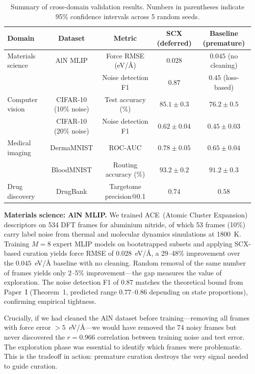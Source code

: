 \begin{table}
\centering
\caption{Summary of cross-domain validation results. Numbers in parentheses indicate 95\% confidence intervals across 5 random seeds.}
\label{tab:summary}
\begin{tabular}{lcccc}
\hline
Domain & Dataset & Metric & SCX (deferred) & Baseline (premature) \\
\hline
Materials science & AlN MLIP & Force RMSE (eV/{\AA}) & $0.028$ & $0.045$ (no cleaning) \\
 & & Noise detection F1 & $0.87$ & $0.45$ (loss-based) \\
Computer vision & CIFAR-10 (10\% noise) & Test accuracy (\%) & $85.1 \pm 0.3$ & $76.2 \pm 0.5$ \\
 & CIFAR-10 (20\% noise) & Noise detection F1 & $0.62 \pm 0.04$ & $0.45 \pm 0.03$ \\
Medical imaging & DermaMNIST & ROC-AUC & $0.78 \pm 0.05$ & $0.65 \pm 0.04$ \\
 & BloodMNIST & Routing accuracy (\%) & $93.2 \pm 0.2$ & $91.2 \pm 0.3$ \\
Drug discovery & DrugBank & Targetome precision@0.1 & $0.74$ & $0.58$ \\
\hline
\end{tabular}
\end{table}

\textbf{Materials science: AlN MLIP.} We trained ACE~(Atomic Cluster Expansion) descriptors on 534 DFT frames for aluminium nitride, of which 53 frames (10\%) carry label noise from thermal and molecular dynamics simulations at 1800~K. Training $M=8$ expert MLIP models on bootstrapped subsets and applying SCX-based curation yields force RMSE of $0.028$~eV/{\AA}, a 29--48\% improvement over the $0.045$~eV/{\AA} baseline with no cleaning. Random removal of the same number of frames yields only 2--5\% improvement---the gap measures the value of exploration. The noise detection F1 of $0.87$ matches the theoretical bound from Paper~I (Theorem~1, predicted range $0.77$--$0.86$ depending on state proportions), confirming empirical tightness.

Crucially, if we had cleaned the AlN dataset before training---removing all frames with force error $> 5$~eV/{\AA}---we would have removed the 74 noisy frames but never discovered the $r=0.966$ correlation between training noise and test error. The exploration phase was essential to identify which frames were problematic. This is the tradeoff in action: premature curation destroys the very signal needed to guide curation.

